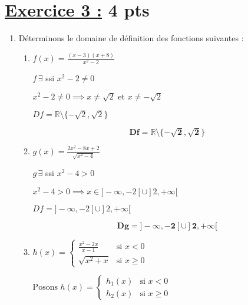 \documentclass[12pt,a4paper]{article}
\begin{document}
\section*{\underline{Exercice 3 :} 4 pts }
\begin{enumerate}
    \item Déterminons le domaine de définition des fonctions suivantes :
          \begin{enumerate}
              \item  \( f(x) = \frac{(x - 3)(x + 8)}{x^2 - 2} \)

                    \(f\,\exists \) ssi \(x^2 - 2 \neq 0\)

                    \(x^2 - 2 \neq 0 \implies x \neq \sqrt{2} \text{ et } x \neq -\sqrt{2}\)

                    \( Df= \mathbb{R}\setminus\{-\sqrt{2},\sqrt{2}\} \)

                    \begin{resultbox}
                        \[
                            \mathbf{Df= \mathbb{R}\setminus\{-\sqrt{2},\sqrt{2}\} }
                        \]
                    \end{resultbox}
              \item \( g(x) = \frac{2x^2 - 8x + 2}{\sqrt{x^2 - 4}} \)

                    \(g\,\exists \) ssi \( x^2 - 4  > 0 \)

                    \( x^2 - 4  > 0 \implies x\in ]-\infty,-2[ \cup ]2,+\infty[ \)

                        \( Df= ]-\infty,-2[ \cup ]2,+\infty[ \)

                    \begin{resultbox}
                        \[
                            \mathbf{Dg= ]-\infty,-2[ \cup ]2,+\infty[ }
                        \]
                    \end{resultbox}
              \item \( h(x) = \left\{
                    \begin{array}{ll}
                        \frac{x^2 - 2x}{x - 1} & \text{si } x < 0    \\
                        \sqrt{x^2 + x}         & \text{si } x \geq 0
                    \end{array}
                    \right. \)

                    \( \text{Posons }h(x) = \left\{
                    \begin{array}{ll}
                        h_{1}(x) & \text{si } x < 0    \\
                        h_{2}(x)         & \text{si } x \geq 0
                    \end{array}
                    \right. \)
                    

\end{enumerate}
\end{enumerate}
\end{document}
